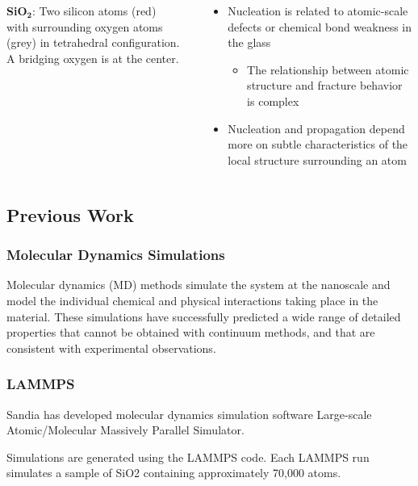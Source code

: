 {\begin{columns}
\begin{column}{.5\textwidth}
    {\bf SiO$_\mathbf{2}$}: Two silicon atoms (red)\\with surrounding oxygen atoms (grey) in tetrahedral configuration. A bridging oxygen is at the center.
    
		\end{column}
   		\begin{column}{.6\textwidth}
        \begin{block}{}
		\begin{itemize} 
        \item Nucleation is related to atomic-scale defects or chemical bond weakness in the glass
		\begin{itemize} 
        \item The relationship between atomic structure and fracture behavior is complex 
		\end{itemize}
        \item Nucleation and propagation depend more on subtle characteristics of the local structure surrounding an atom\\
    \end{itemize}
    \end{block}
		\end{column}
	\end{columns}
}


\subsection{Previous Work}
\frame
{\frametitle{Molecular Dynamics Simulations}
\begin{block}{}
Molecular dynamics (MD) methods simulate the system at the nanoscale and model the individual chemical and physical interactions taking place in the material.
\newline
\newline
These simulations have successfully predicted a wide range of detailed
properties that cannot be obtained with continuum methods, and that are
consistent with experimental observations.
\end{block}
}


\frame
{
\frametitle{LAMMPS}
\begin{block}{} 

Sandia has developed molecular dynamics simulation software Large-scale Atomic/Molecular Massively Parallel Simulator.

Simulations are generated using the LAMMPS code. Each LAMMPS run simulates a sample of SiO2 containing approximately 70,000 atoms.
\end{block}
}

